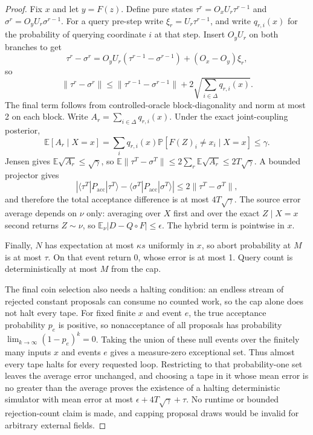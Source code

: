 \documentclass[11pt]{article}
\theoremstyle{definition}\newtheorem{definition}[theorem]{Definition}
\theoremstyle{remark}\newtheorem{remark}[theorem]{Remark}
\newcommand{\E}{\mathbb E}\newcommand{\Prb}{\mathbb P}
\begin{document}
\begin{proof}
Fix \(x\) and let \(y=F(z)\). Define pure states \(\tau^r=O_xU_r\tau^{r-1}\) and \(\sigma^r=O_yU_r\sigma^{r-1}\). For a query pre-step write \(\xi_r=U_r\tau^{r-1}\), and write \(q_{r,i}(x)\) for the probability of querying coordinate \(i\) at that step. Insert \(O_yU_r\) on both branches to get
\[
 \tau^r-\sigma^r=O_yU_r(\tau^{r-1}-\sigma^{r-1})+(O_x-O_y)\xi_r,
\]
so
\[
 \|\tau^r-\sigma^r\|\le\|\tau^{r-1}-\sigma^{r-1}\|+2\sqrt{\sum_{i\in\Delta}q_{r,i}(x)}.
\]
The final term follows from controlled-oracle block-diagonality and norm at most 2 on each block. Write \(A_r=\sum_{i\in\Delta}q_{r,i}(x)\). Under the exact joint-coupling posterior,
\[
 \E[A_r\mid X=x]=\sum_iq_{r,i}(x)\Prb[F(Z)_i\ne x_i\mid X=x]\le\gamma.
\]
Jensen gives \(\E\sqrt{A_r}\le\sqrt\gamma\), so \(\E\|\tau^T-\sigma^T\|\le2\sum_r\E\sqrt{A_r}\le2T\sqrt\gamma\). A bounded projector gives
\[
 |\langle\tau^T|P_{\mathrm{acc}}|\tau^T\rangle-\langle\sigma^T|P_{\mathrm{acc}}|\sigma^T\rangle|\le2\|\tau^T-\sigma^T\|,
\]
and therefore the total acceptance difference is at most \(4T\sqrt\gamma\). The source error average depends on \(\nu\) only: averaging over \(X\) first and over the exact \(Z\mid X=x\) second returns \(Z\sim\nu\), so \(\E_\nu|D-Q\circ F|\le\epsilon\). The hybrid term is pointwise in \(x\).

Finally, \(N\) has expectation at most \(\kappa s\) uniformly in \(x\), so abort probability at \(M\) is at most \(\tau\). On that event return 0, whose error is at most 1. Query count is deterministically at most \(M\) from the cap.

The final coin selection also needs a halting condition: an endless stream of rejected constant proposals can consume no counted work, so the cap alone does not halt every tape. For fixed finite \(x\) and event \(e\), the true acceptance probability \(p_e\) is positive, so nonacceptance of all proposals has probability \(\lim_{k\to\infty}(1-p_e)^k=0\). Taking the union of these null events over the finitely many inputs \(x\) and events \(e\) gives a measure-zero exceptional set. Thus almost every tape halts for every requested loop. Restricting to that probability-one set leaves the average error unchanged, and choosing a tape in it whose mean error is no greater than the average proves the existence of a halting deterministic simulator with mean error at most \(\epsilon+4T\sqrt\gamma+\tau\). No runtime or bounded rejection-count claim is made, and capping proposal draws would be invalid for arbitrary external fields.
\end{proof}
\end{document}
